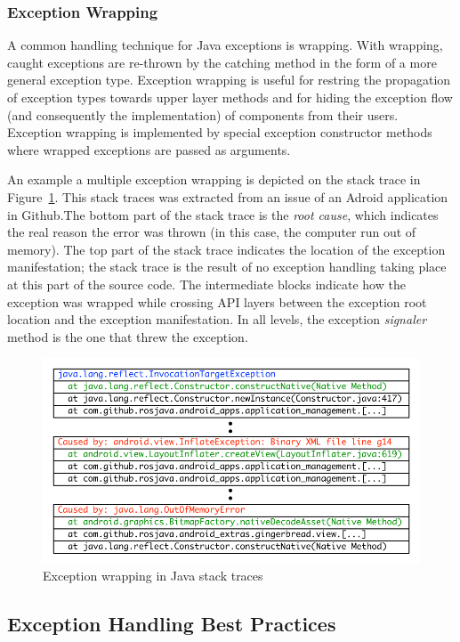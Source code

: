 \documentclass[conference]{IEEEtran}
\begin{document}
\subsubsection{Exception Wrapping}
A common handling technique for Java exceptions is wrapping. With wrapping, caught exceptions
are re-thrown by the catching method in the form of a more general exception type.
Exception wrapping is useful for restring the propagation of exception types towards
upper layer methods and for hiding the exception flow (and consequently the implementation)
of components from their users. Exception wrapping is implemented by special exception
constructor methods where wrapped exceptions are passed as arguments. 

An example a multiple exception wrapping is depicted on the stack trace
 in Figure~\ref{fig:wrapping}. This stack traces was extracted from an issue of an Adroid application in Github.The bottom part of the stack trace is the \emph{root cause}, which indicates
the real reason the error was thrown (in this case, the computer run out of
memory). The top part of the stack trace indicates the location
of the exception manifestation; the stack trace is the result of no 
exception handling taking place at this part of the source code.
The intermediate blocks indicate how the exception was wrapped
while crossing API layers between the exception root location and the
exception manifestation. In all levels, the exception \emph{signaler}
method is the one that threw the exception.

\begin{figure}
\centering
\includegraphics[scale=0.8]{wrappings}
\caption{Exception wrapping in Java stack traces}
\label{fig:wrapping}
\end{figure}


\subsection{Exception Handling Best Practices}
\end{document}
